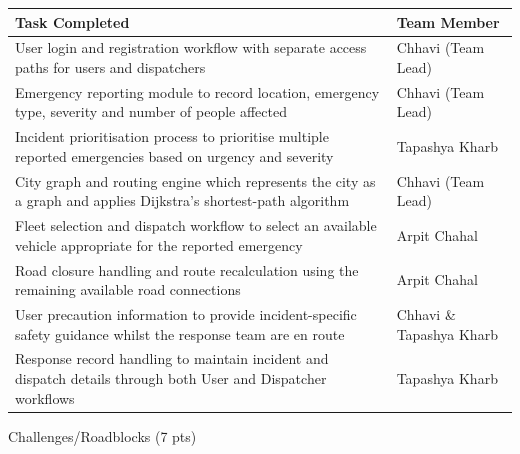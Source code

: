\documentclass[12pt,a4paper]{article}
\renewcommand{\arraystretch}{1}
\newcommand{\sectiontitle}[1]{%
    {\color{GEUBlue}
    \fontsize{18}{22}\selectfont #1}
}
\begin{document}
\setlength{\tabcolsep}{6pt}
\renewcommand{\arraystretch}{1.1}
\begin{tabularx}{\textwidth}{
|>{\raggedright\arraybackslash}p{}
|>{\raggedright\arraybackslash}X|
}
\hline
\textbf{Task Completed} & \textbf{Team Member} \\
\hline
User login and registration workflow with separate access paths for users and dispatchers & Chhavi (Team Lead) \\
\hline
Emergency reporting module to record location, emergency type, severity and number of people affected & Chhavi (Team Lead) \\
\hline
Incident prioritisation process to prioritise multiple reported emergencies based on urgency and severity & Tapashya Kharb \\
\hline
City graph and routing engine which represents the city as a graph and applies Dijkstra's shortest-path algorithm & Chhavi (Team Lead) \\
\hline
Fleet selection and dispatch workflow to select an available vehicle appropriate for the reported emergency & Arpit Chahal \\
\hline
Road closure handling and route recalculation using the remaining available road connections & Arpit Chahal \\
\hline
User precaution information to provide incident-specific safety guidance whilst the response team are en route & Chhavi \& Tapashya Kharb \\
\hline
Response record handling to maintain incident and dispatch details through both User and Dispatcher workflows & Tapashya Kharb \\
\hline
\end{tabularx}
\renewcommand{\arraystretch}{1}

\vspace{0.70cm}

\Needspace{8cm}\sectiontitle{Challenges/Roadblocks (7 pts)}

\vspace{0.40cm}
\end{document}
